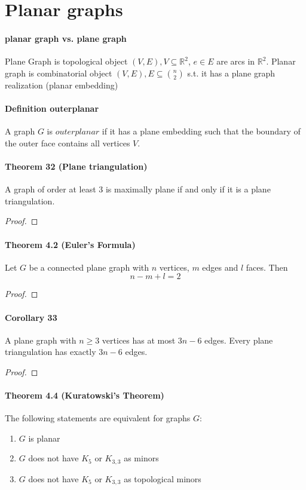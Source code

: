 \section{Planar graphs}

\paragraph{planar graph vs. plane graph}
Plane Graph is topological object $ (V,E), V \subseteq \mathbb{R}^2$, 
$ e \in E $ are arcs in $ \mathbb{R}^2$.
Planar graph is combinatorial object $ (V,E), E \subseteq \binom{n}{2} $ s.t. 
it has a plane graph realization (planar embedding)

\paragraph{Definition outerplanar}
A graph $ G $ is $outerplanar$ if it has a plane embedding such that the
boundary of the outer face contains all vertices $ V $.


\paragraph{Theorem 32 (Plane triangulation)} A graph of order at least 3 is 
maximally plane if and only if it is a plane triangulation.
\begin{proof}
    {\color{red}{TODO}}    
\end{proof}

\paragraph{Theorem 4.2 (Euler's Formula)} Let $ G $ be a connected plane graph 
with $ n $ vertices, $ m $ edges and $ l $ faces. Then 
$$ n - m + l = 2 $$
\begin{proof}
    {\color{red}{TODO}}    
\end{proof}

\paragraph{Corollary 33} A plane graph with $ n \geq 3 $ vertices has at most 
$ 3n - 6 $ edges. Every plane triangulation has exactly $ 3n - 6 $ edges.
\begin{proof}
    {\color{red}{TODO}}   
\end{proof}

\paragraph{Theorem 4.4 (Kuratowski's Theorem)} The following statements are 
equivalent for graphs $ G$:
\begin{enumerate}
    \item $ G $ is planar 
    \item $ G $ does not have $ K_5 $ or $ K_{3,3} $ as minors
    \item $ G $ does not have $ K_5 $ or $ K_{3,3} $ as topological minors
\end{enumerate}

